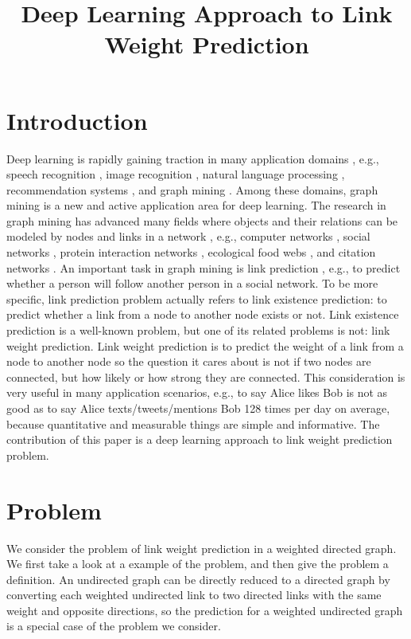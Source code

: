 \documentclass[letterpaper]{article}
\title{Deep Learning Approach to Link Weight Prediction}
\begin{document}
\maketitle

\section{Introduction}
Deep learning is rapidly gaining traction in many application domains \cite{lecun2015deep}, e.g.,
speech recognition \cite{hannun2014deep},
image recognition \cite{simonyan2014very},
natural language processing \cite{yao2013recurrent},
recommendation systems \cite{barkan2016item2vec},
and graph mining \cite{grovernode2vec}.
Among these domains,
graph mining is a new and active application area for deep learning.
The research in graph mining has advanced many fields
where objects and their relations can be modeled by nodes and links in a network \cite{chakrabarti2006graph}, e.g.,
computer networks \cite{bermond1995distributed},
social networks \cite{cook2006mining},
protein interaction networks \cite{bader2003automated},
ecological food webs \cite{brown2003ecological},
and citation networks \cite{greenberg2009citation}.
An important task in graph mining is link prediction \cite{liben2007link},
e.g., to predict whether a person will follow another person in a social network.
To be more specific,
link prediction problem actually refers to link existence prediction:
to predict whether a link from a node to another node exists or not.
Link existence prediction is a well-known problem,
but one of its related problems is not: link weight prediction.
Link weight prediction is
to predict the weight of a link from a node to another node
so the question it cares about is not if two nodes are connected,
but how likely or how strong they are connected.
This consideration is very useful in many application scenarios, e.g.,
to say Alice likes Bob is not as good as
to say Alice texts/tweets/mentions Bob 128 times per day on average,
because quantitative and measurable things are simple and informative.
The contribution of this paper is
a deep learning approach to link weight prediction problem.

\section{Problem}
We consider the problem of link weight prediction in a weighted directed graph.
We first take a look at a example of the problem,
and then give the problem a definition.
An undirected graph can be directly reduced to a directed graph by converting each weighted undirected link to two directed links with the same weight and opposite directions,
so the prediction for a weighted undirected graph is a special case of the problem we consider.
\end{document}
